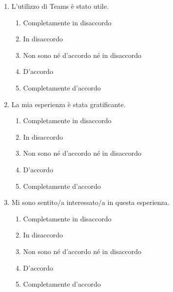 \documentclass{article}
\newcommand{\app}{Teams \hspace{0.1em}}
\begin{document}
\begin{enumerate}[label=\textbf{Domanda \arabic*.}, resume]
    \item L’utilizzo di \app è stato utile.
    \begin{enumerate}
    \item Completamente in disaccordo
    \item In disaccordo
    \item Non sono né d’accordo né in disaccordo
    \item D’accordo
    \item Completamente d’accordo
\end{enumerate}
    \item La mia esperienza è stata gratificante.
    \begin{enumerate}
    \item Completamente in disaccordo
    \item In disaccordo
    \item Non sono né d’accordo né in disaccordo
    \item D’accordo
    \item Completamente d’accordo
\end{enumerate}
    \item Mi sono sentito/a interessato/a in questa esperienza.
    \begin{enumerate}
    \item Completamente in disaccordo
    \item In disaccordo
    \item Non sono né d’accordo né in disaccordo
    \item D’accordo
    \item Completamente d’accordo
\end{enumerate}
\end{enumerate}
\end{document}

